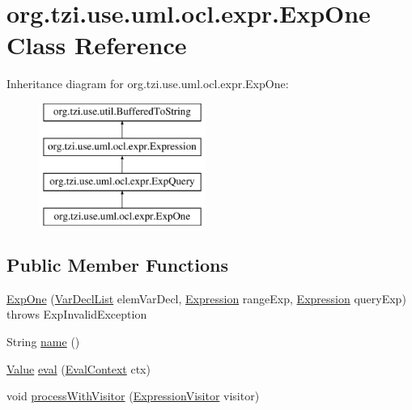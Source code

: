 \hypertarget{classorg_1_1tzi_1_1use_1_1uml_1_1ocl_1_1expr_1_1_exp_one}{\section{org.\-tzi.\-use.\-uml.\-ocl.\-expr.\-Exp\-One Class Reference}
\label{classorg_1_1tzi_1_1use_1_1uml_1_1ocl_1_1expr_1_1_exp_one}
}
Inheritance diagram for org.\-tzi.\-use.\-uml.\-ocl.\-expr.\-Exp\-One\-:\begin{figure}[H]
\begin{center}
\leavevmode
\includegraphics[height=4.000000cm]{classorg_1_1tzi_1_1use_1_1uml_1_1ocl_1_1expr_1_1_exp_one}
\end{center}
\end{figure}
\subsection*{Public Member Functions}
\begin{DoxyCompactItemize}
\item 
\hyperlink{classorg_1_1tzi_1_1use_1_1uml_1_1ocl_1_1expr_1_1_exp_one_af9108064914c748a53ef3744dec9b76f}{Exp\-One} (\hyperlink{classorg_1_1tzi_1_1use_1_1uml_1_1ocl_1_1expr_1_1_var_decl_list}{Var\-Decl\-List} elem\-Var\-Decl, \hyperlink{classorg_1_1tzi_1_1use_1_1uml_1_1ocl_1_1expr_1_1_expression}{Expression} range\-Exp, \hyperlink{classorg_1_1tzi_1_1use_1_1uml_1_1ocl_1_1expr_1_1_expression}{Expression} query\-Exp)  throws Exp\-Invalid\-Exception     
\item 
String \hyperlink{classorg_1_1tzi_1_1use_1_1uml_1_1ocl_1_1expr_1_1_exp_one_a5920baeb8fb26fa720f3a86f1a7e084d}{name} ()
\item 
\hyperlink{classorg_1_1tzi_1_1use_1_1uml_1_1ocl_1_1value_1_1_value}{Value} \hyperlink{classorg_1_1tzi_1_1use_1_1uml_1_1ocl_1_1expr_1_1_exp_one_a120f1db03eb2025aa30cd2cefce40188}{eval} (\hyperlink{classorg_1_1tzi_1_1use_1_1uml_1_1ocl_1_1expr_1_1_eval_context}{Eval\-Context} ctx)
\item 
void \hyperlink{classorg_1_1tzi_1_1use_1_1uml_1_1ocl_1_1expr_1_1_exp_one_acd4118e460c891c2d09e8c2e7d2028b8}{process\-With\-Visitor} (\hyperlink{interfaceorg_1_1tzi_1_1use_1_1uml_1_1ocl_1_1expr_1_1_expression_visitor}{Expression\-Visitor} visitor)
\end{DoxyCompactItemize}
